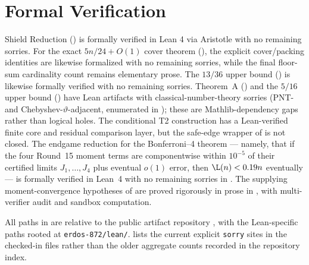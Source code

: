 \section{Formal Verification}\label{sec:formal-verification}

Shield Reduction () is formally verified in Lean
4 via Aristotle with no remaining sorries.  For the exact
$5n/24+O(1)$ cover theorem (), the explicit cover/packing
identities are likewise formalized with no remaining sorries, while the final
floor-sum cardinality count remains elementary prose.  The $13/36$ upper bound
() is likewise formally verified with no remaining sorries.
Theorem~A () and the $5/16$ upper bound
() have Lean artifacts with classical-number-theory sorries
(PNT- and Chebyshev-$\vartheta$-adjacent, enumerated in
); these are Mathlib-dependency gaps rather than
logical holes.  The conditional T2 construction has a Lean-verified finite
core and residual comparison layer, but the safe-edge wrapper of
 is not closed.  The endgame reduction
for the Bonferroni--4 theorem --- namely, that if the four Round~15 moment
terms are componentwise within $10^{-5}$ of their certified limits
$J_1,\dots,J_4$ plus eventual $o(1)$ error, then $\L(n)<0.19n$ eventually --- is
formally verified in Lean~4 with no remaining sorries in
.  The
supplying moment-convergence hypotheses of 
are proved rigorously in prose in , with multi-verifier
audit and sandbox computation.

All paths in  are relative to the public artifact
repository \cite{ErdosHarness26}, with the Lean-specific paths rooted at
\texttt{erdos-872/lean/}.   lists the current explicit
\texttt{sorry} sites in the checked-in files rather than the older aggregate
counts recorded in the repository index.

